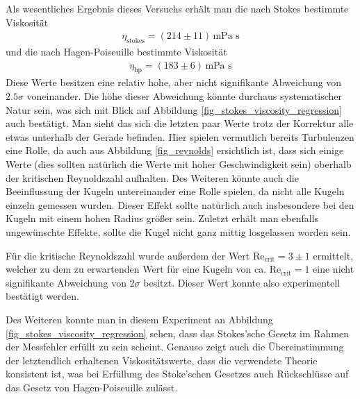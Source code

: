 \documentclass[12pt,a4paper,german]{scrartcl}
\numberwithin{equation}{section}
\begin{document}
  Als wesentliches Ergebnis dieses Versuchs erhält man die nach Stokes bestimmte Viskosität
  \begin{align}
    \eta_\text{stokes} = (214 \pm 11) \, \text{mPa s}
  \end{align}
  und die nach Hagen-Poiseuille bestimmte Viskosität
  \begin{align}
    \eta_\text{hp} = (183 \pm 6) \, \text{mPa s}
  \end{align}
  Diese Werte besitzen eine relativ hohe, aber nicht signifikante Abweichung von $2.5\sigma$ voneinander.
  Die höhe dieser Abweichung könnte durchaus systematischer Natur sein, was sich mit Blick auf Abbildung \ref{fig_stokes_viscosity_regression} auch bestätigt.
  Man sieht das sich die letzten paar Werte trotz der Korrektur alle etwas unterhalb der Gerade befinden.
  Hier spielen vermutlich bereits Turbulenzen eine Rolle, da auch aus Abbildung \ref{fig_reynolds} ersichtlich ist, dass sich einige Werte (dies sollten natürlich die Werte mit hoher Geschwindigkeit sein) oberhalb der kritischen Reynoldszahl aufhalten.
  Des Weiteren könnte auch die Beeinflussung der Kugeln untereinander eine Rolle spielen, da nicht alle Kugeln einzeln gemessen wurden.
  Dieser Effekt sollte natürlich auch insbesondere bei den Kugeln mit einem hohen Radius größer sein.
  Zuletzt erhält man ebenfalls ungewünschte Effekte, sollte die Kugel nicht ganz mittig losgelassen worden sein.

  Für die kritische Reynoldszahl wurde außerdem der Wert $\text{Re}_\text{crit} = 3 \pm 1$ ermittelt, welcher zu dem zu erwartenden Wert für eine Kugeln von ca. $\text{Re}_\text{crit} = 1$ eine nicht signifikante Abweichung von $2\sigma$ besitzt. Dieser Wert konnte also experimentell bestätigt werden.

  Des Weiteren konnte man in diesem Experiment an Abbildung \ref{fig_stokes_viscosity_regression} sehen, dass das Stokes'sche Gesetz im Rahmen der Messfehler erfüllt zu sein scheint.
  Genauso zeigt auch die Übereinstimmung der letztendlich erhaltenen Viskositätswerte, dass die verwendete Theorie konsistent ist, was bei Erfüllung des Stoke'schen Gesetzes auch Rückschlüsse auf das Gesetz von Hagen-Poiseuille zulässt.
\end{document}
